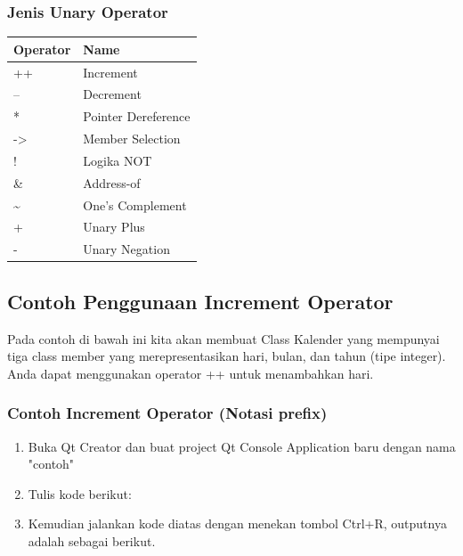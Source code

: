

\subsubsection{Jenis Unary Operator}

\begin{longtable}[]{@{}ll@{}}
\toprule
\textbf{Operator} & \textbf{Name} \\
\midrule
\endhead
++ & Increment \\
-- & Decrement \\
* & Pointer Dereference \\
-> & Member Selection \\
! & Logika NOT \\
\& & Address-of \\
\textasciitilde{} & One's Complement \\
+ & Unary Plus \\
- & Unary Negation \\
\bottomrule
\end{longtable}

\subsection{Contoh Penggunaan Increment Operator}

Pada contoh di bawah ini kita akan membuat Class Kalender yang mempunyai tiga class member yang merepresentasikan hari, bulan, dan tahun (tipe integer). Anda dapat menggunakan operator ++ untuk menambahkan hari.

\subsubsection*{Contoh Increment Operator (Notasi prefix)}

\begin{enumerate}
\item Buka Qt Creator dan buat project Qt Console Application baru dengan nama "contoh"
\item Tulis kode berikut:




\item
 Kemudian jalankan kode diatas dengan menekan tombol Ctrl+R, outputnya
 adalah sebagai berikut.
\end{enumerate}

